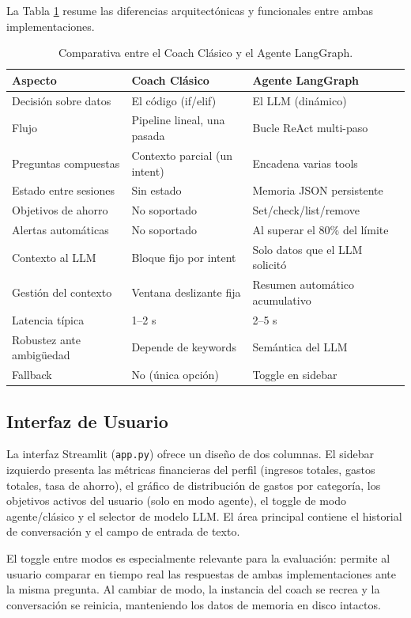 La Tabla \ref{tab:comparativa} resume las diferencias arquitectónicas y funcionales entre ambas implementaciones.

\begin{table}[t]
\centering
\caption{Comparativa entre el Coach Clásico y el Agente LangGraph.}
\label{tab:comparativa}
\begin{tabular}{@{}lll@{}}
\toprule
\textbf{Aspecto} & \textbf{Coach Clásico} & \textbf{Agente LangGraph} \\
\midrule
Decisión sobre datos & El código (if/elif) & El LLM (dinámico) \\
Flujo & Pipeline lineal, una pasada & Bucle ReAct multi-paso \\
Preguntas compuestas & Contexto parcial (un intent) & Encadena varias tools \\
Estado entre sesiones & Sin estado & Memoria JSON persistente \\
Objetivos de ahorro & No soportado & Set/check/list/remove \\
Alertas automáticas & No soportado & Al superar el 80\% del límite \\
Contexto al LLM & Bloque fijo por intent & Solo datos que el LLM solicitó \\
Gestión del contexto & Ventana deslizante fija & Resumen automático acumulativo \\
Latencia típica & 1--2 s & 2--5 s \\
Robustez ante ambigüedad & Depende de keywords & Semántica del LLM \\
Fallback & No (única opción) & Toggle en sidebar \\
\bottomrule
\end{tabular}
\end{table}

\subsection{Interfaz de Usuario}
\label{subsec:interfaz}

La interfaz Streamlit (\texttt{app.py}) ofrece un diseño de dos columnas. El sidebar izquierdo presenta las métricas financieras del perfil (ingresos totales, gastos totales, tasa de ahorro), el gráfico de distribución de gastos por categoría, los objetivos activos del usuario (solo en modo agente), el toggle de modo agente/clásico y el selector de modelo LLM. El área principal contiene el historial de conversación y el campo de entrada de texto.

El toggle entre modos es especialmente relevante para la evaluación: permite al usuario comparar en tiempo real las respuestas de ambas implementaciones ante la misma pregunta. Al cambiar de modo, la instancia del coach se recrea y la conversación se reinicia, manteniendo los datos de memoria en disco intactos.

